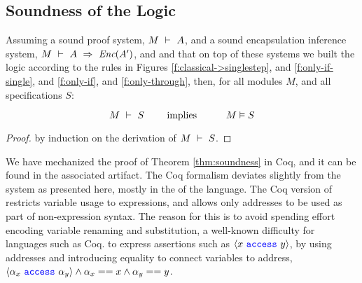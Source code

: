 \subsection{Soundness of the \Nec Logic}

\label{s:soundness}

\begin{theorem}[Soundness]
\label{thm:soundness}
\sophiaPonder[renamed H to S]{}
Assuming a sound \SpecO proof system, $M\ \vdash\ A$, and
a sound encapsulation inference system, $M\ \vdash\ A\ \Rightarrow\ \textit{Enc}(A')$,
 and  and that on top of these systems we built
 the \Nec logic according to the rules in Figures \ref{f:classical->singlestep},  and \ref{f:only-if-single}, and \ref{f:only-if},  and \ref{f:only-through},   then, for    all modules $M$, and all \Nec specifications  $S$:
 
 $$\proves{M}{S}\ \ \ \ \ \ \ \mbox{implies}\ \ \ \ \ \  \ \ \ \satisfies{M}{S}$$
\end{theorem}

\begin{proof}
by induction on the derivation of $M\ \vdash\ S$.
\end{proof}

We have mechanized the proof of Theorem \ref{thm:soundness} in Coq, and it 
can be found in the associated artifact. 
The   Coq formalism deviates slightly from the system as
presented here,  mostly in the  of the 
\SpecO language. The Coq version of \SpecO restricts variable usage to expressions, and allows only addresses to 
be used as part of non-expression syntax. 
The reason for this  is to avoid spending %
 effort encoding variable
renaming and substitution, a well-known difficulty for languages such as Coq. 
 to express assertions such as $\langle x\ {\color{blue}\texttt{access}}\ y \rangle$, by using addresses and introducing equality  %
to connect variables to address, \ie
 $\langle \alpha_x\ {\color{blue}\texttt{access}}\ \alpha_y \rangle \wedge \alpha_x == x \wedge \alpha_y == y$.



